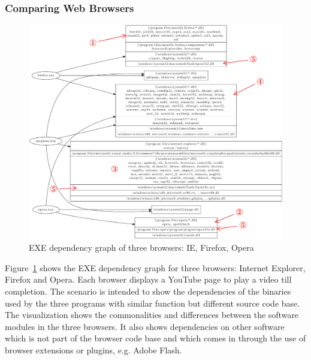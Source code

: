 \subsubsection{Comparing Web Browsers}

\begin{figure}[bthp]
\centering
\includegraphics[width=1.0\textwidth]{depvis/browsers-group-annot.pdf}
\caption{EXE dependency graph of three browsers: IE, Firefox, Opera}
\label{fig:browsers}
\end{figure}

Figure~\ref{fig:browsers} shows the EXE dependency graph for three
brow\-sers: Internet Explorer, Firefox and Opera.
Each browser displays a YouTube page to play a
video till completion. The scenario is intended to show the dependencies
of the binaries used by the three programs
with similar function but different source code base.
The visualization shows the commonalities and differences
between the software modules in the three browsers.
It also shows dependencies on other software which is not part of
the browser code base and
which comes in through the use of browser extensions or plugins,
e.g. Adobe Flash.


